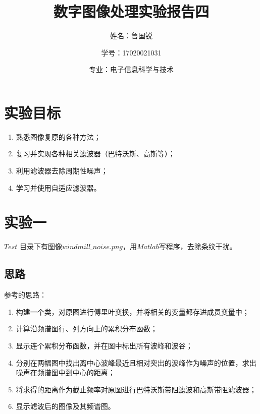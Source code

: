 \documentclass[UTF8]{ctexart}
\title{数字图像处理实验报告四}
\author{姓名：鲁国锐 \protect\newline
\and 学号：17020021031 \\
\and 专业：电子信息科学与技术}
\begin{document}
	\maketitle
	\renewcommand{\contentsname}{目录}
	\renewcommand{\listfigurename}{插图目录}
	\renewcommand{\listtablename}{表格目录}
	\renewcommand{\refname}{参考文献}
	\renewcommand{\abstractname}{摘要}
	\renewcommand{\indexname}{索引}
	\renewcommand{\tablename}{表}
	\renewcommand{\figurename}{图}
	
	
	
	\tableofcontents
	\newpage
	
	\hypersetup{
	bookmarks=true,
	colorlinks=true,
	linkcolor=red,
	urlcolor=blue
	}
    
    \section{实验目标}
    
                \begin{enumerate}[leftmargin=50pt]
    				\item 熟悉图像复原的各种方法；
    				\item 复习并实现各种相关滤波器（巴特沃斯、高斯等）；
    				\item 利用滤波器去除周期性噪声；
    				\item 学习并使用自适应滤波器。
    			\end{enumerate}    

	\section{实验一}
	\indent $Test$ 目录下有图像$windmill\_noise.png$，用$Matlab$写程序，去除条纹干扰。

			
%		
%        
        \subsection{思路}
            \indent 参考\cite{邹园园2009基于频域滤波的}的思路：
    			
                \begin{enumerate}[leftmargin=50pt]
    				\item 构建一个类，对原图进行傅里叶变换，并将相关的变量都存进成员变量中；
                    \item 计算沿频谱图行、列方向上的累积分布函数；
                    \item 显示连个累积分布函数，并在图中标出所有波峰和波谷；
                    \item 分别在两幅图中找出离中心波峰最近且相对突出的波峰作为噪声的位置，求出噪声在频谱图中到中心的距离；
                    \item 将求得的距离作为截止频率对原图进行巴特沃斯带阻滤波和高斯带阻滤波器；
                    \item 显示滤波后的图像及其频谱图。
    			\end{enumerate}                
            
\end{document}
